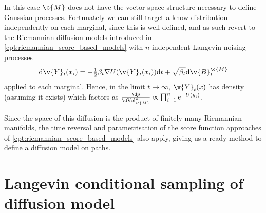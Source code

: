In this case \(\c{M}\) does not have the vector space structure necessary to define Gaussian processes.
Fortunately we can still target a know distribution independently on each marginal, since this is well-defined, and as such revert to the Riemannian diffusion models introduced in \cref{cpt:riemannian_score_based_models} with \(n\) independent Langevin noising processes 
\begin{equation} \label{eq:forward_SDE_manifold} \mathrm{d} {\v{Y}}_t(x_i) = - \tfrac{1}{2} \beta_t\nabla U({\v{Y}}_t(x_i)) \mathrm{d} t + \sqrt{\beta_t } \mathrm{d} \v{B}_t^\c{M}
\end{equation} applied to each marginal.
Hence, in the limit \(t \rightarrow \infty\), \({\v{Y}}_t(x)\) has density (assuming it exists) which factors as \(\frac{\d p}{\d \mathrm{Vol}_\c{M}^n} \propto \prod_{i=1}^n e^{-U(y_i)}\).

Since the space of this diffusion is the product of finitely many Riemannian manifolds, the time reversal and parametrisation of the score function approaches of \cref{cpt:riemannian_score_based_models} also apply, giving us a ready method to define a diffusion model on paths.

\section{Langevin conditional sampling of diffusion model}
\label{sec:conditional_sampling}

